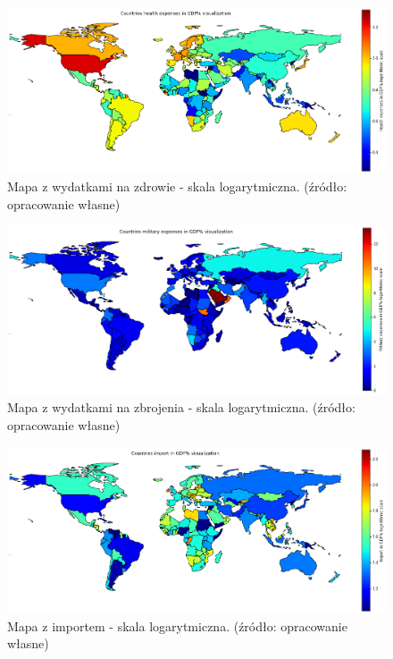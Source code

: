 \documentclass[11pt]{report}
\begin{document}
    \begin{figure}[!htp]
        \centering
        \includegraphics[width=1 \textwidth]{fig/CLUST/health2015.png}
        \caption{Mapa z wydatkami na zdrowie - skala logarytmiczna. (źródło: opracowanie własne)}
        \label{fig:clustHealth2015_log}
    \end{figure}

    \begin{figure}[!htp]
        \centering
        \includegraphics[width=1 \textwidth]{fig/CLUST/military2015.png}
        \caption{Mapa z wydatkami na zbrojenia - skala logarytmiczna. (źródło: opracowanie własne)}
        \label{fig:clustMilitary2015_log}
    \end{figure}

    \begin{figure}[!htp]
        \centering
        \includegraphics[width=1 \textwidth]{fig/CLUST/import2015.png}
        \caption{Mapa z importem - skala logarytmiczna. (źródło: opracowanie własne)}
        \label{fig:clustImport2015_log}
    \end{figure}
\end{document}
